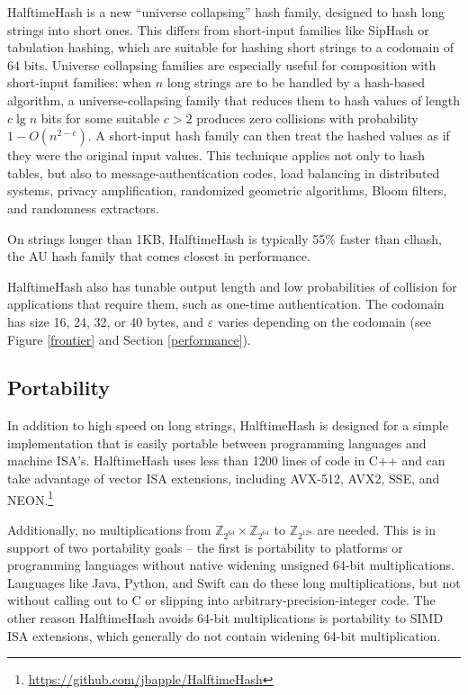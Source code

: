 \documentclass{llncs}
\newcommand{\ints}{\mathbb{Z}}
\begin{document}
HalftimeHash is a new ``universe collapsing'' hash family, designed to hash long strings into short ones. \cite{linear-hash-functions,hashing-without-primes-revisited,cuckoo-journal}
This differs from short-input families like SipHash or tabulation hashing, which are suitable for hashing short strings to a codomain of 64 bits. \cite{siphash,tabulation}
Universe collapsing families are especially useful for composition with short-input families: when $n$ long strings are to be handled by a hash-based algorithm, a universe-collapsing family that reduces them to hash values of length $c \lg n$ bits for some suitable $c > 2$ produces zero collisions with probability $1-O(n^{2-c})$.
A short-input hash family can then treat the hashed values as if they were the original input values. \cite{universe-collapse-linear-probing,siphash,tabulation,simple-hash-functions-work}
This technique applies not only to hash tables, but also to message-authentication codes, load balancing in distributed systems, privacy amplification, randomized geometric algorithms, Bloom filters, and randomness extractors. \cite{poly1305,chord,privacy-amplification,random-closest-pair,simple-hash-functions-work,fuzzy-extractors}

On strings longer than 1KB, HalftimeHash is typically 55\% faster than clhash, the AU hash family that comes closest in performance.

HalftimeHash also has tunable output length and low probabilities of collision for applications that require them, such as one-time authentication.\cite{nacl}
The codomain has size 16, 24, 32, or 40 bytes, and $\varepsilon$ varies depending on the codomain (see Figure \ref{frontier} and Section \ref{performance}).

\subsection{Portability}

In addition to high speed on long strings, HalftimeHash is designed for a simple implementation that is easily portable between programming languages and machine ISA's.
HalftimeHash uses less than 1200 lines of code in C++ and can take advantage of vector ISA extensions, including AVX-512, AVX2, SSE, and NEON.\footnote{\url{https://github.com/jbapple/HalftimeHash}}

Additionally, no multiplications from $\ints_{2^{64}} \times \ints_{2^{64}}$ to $\ints_{2^{128}}$ are needed.
This is in support of two portability goals -- the first is portability to platforms or programming languages without native widening unsigned 64-bit multiplications.
Languages like Java, Python, and Swift can do these long multiplications, but not without calling out to C or slipping into arbitrary-precision-integer code.
The other reason HalftimeHash avoids 64-bit multiplications is portability to SIMD ISA extensions, which generally do not contain widening 64-bit multiplication.
\end{document}
